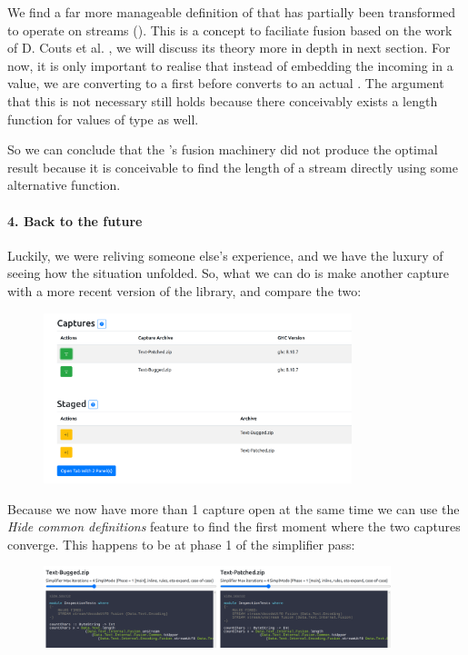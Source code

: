 We find a far more manageable definition of  that has partially been transformed to operate on streams ().
This is a concept to faciliate fusion based on the work of D. Couts et al. \cite{stream_fusion}, we will discuss its theory more
in depth in next section. For now, it is only important to realise that instead of embedding the
incoming  in a  value, we are converting to a  first before 
converts to an actual . The argument that this is not necessary still holds because there conceivably exists a length
function for values of type  as well. 

So we can conclude that the 's fusion machinery did not produce the optimal result because it is conceivable to find the
length of a stream directly using some alternative  function.

\paragraph{4. Back to the future}

Luckily, we were reliving someone else's experience, and we have the luxury of seeing how the situation unfolded.
So, what we can do is make another capture with a more recent version of the library, and compare the two:

\begin{figure}[H]
\centering
\includegraphics[width=0.8\textwidth]{figs/countchars_5.png}
\end{figure}

Because we now have more than 1 capture open at the same time we can use the \textit{Hide common definitions} feature to
find the first moment where the two captures converge. This happens to be at phase 1 of the simplifier pass:

\begin{figure}[H]
\centering
\includegraphics[width=0.9\textwidth]{figs/countchars_6.png}
\end{figure}

